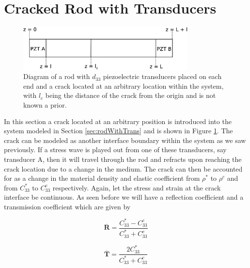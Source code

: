 
\section{Cracked Rod with Transducers}
\label{sec:rodTransCrack}

\begin{figure}[ht!]
\centering
\includegraphics[width=0.8\textwidth]{eps_pics/rodTransCrack.eps}
\caption{Diagram of a rod with $d_{33}$ piezoelectric transducers placed on each end and a crack located at an arbitrary location within the system, with $l_c$ being the distance of the crack from the origin and is not known a prior.
	 \label{fig:rodTransCrack}} 
\end{figure}


In this section a crack located at an arbitrary position is introduced into the system modeled in Section \ref{sec:rodWithTrans} and is shown in Figure \ref{fig:rodTransCrack}. The crack can be modeled as another interface boundary within the system as we saw previously. If a stress wave is played out from one of these transducers, say transducer A, then it will travel through the rod and refracts upon reaching the crack location due to a change in the medium. The crack can then be accounted for as a change in the material density and elastic coefficient from $\rho ^*$ to $\rho ^c$ and from $C^*_{33}$ to $C^c_{33}$ respectively. Again, let the stress and strain at the crack interface be continuous. As seen before we will have a reflection coefficient and a transmission coefficient which are given by

\begin{equation}
\boldsymbol{\overline{R}} = \frac{C^*_{33} - C^c_{33}}{C^*_{33} + C^c_{33}}
\end{equation}

\begin{equation}
\boldsymbol{\overline{T}} = \frac{2C^*_{33}}{C^*_{33} + C^c_{33}}
\end{equation}



